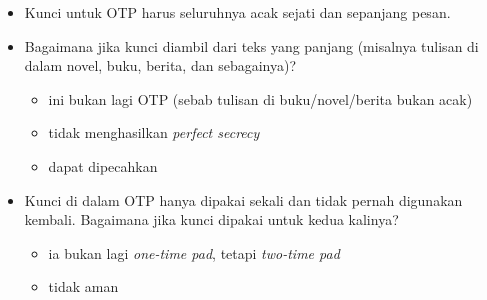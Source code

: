 \documentclass{article}
\begin{document}

\begin{itemize}
    \item Kunci untuk OTP harus seluruhnya acak sejati dan sepanjang pesan.
    \item Bagaimana jika kunci diambil dari teks yang panjang (misalnya tulisan di dalam novel, buku, berita, dan sebagainya)?
    \begin{itemize}
        \item ini bukan lagi OTP (sebab tulisan di buku/novel/berita bukan acak)
        \item tidak menghasilkan \textit{perfect secrecy}
        \item dapat dipecahkan
    \end{itemize}
    \item Kunci di dalam OTP hanya dipakai sekali dan tidak pernah digunakan kembali. Bagaimana jika kunci dipakai untuk kedua kalinya?
    \begin{itemize}
        \item ia bukan lagi \textit{one-time pad}, tetapi \textit{two-time pad}
        \item tidak aman
    \end{itemize}
\end{itemize}
\end{document}
